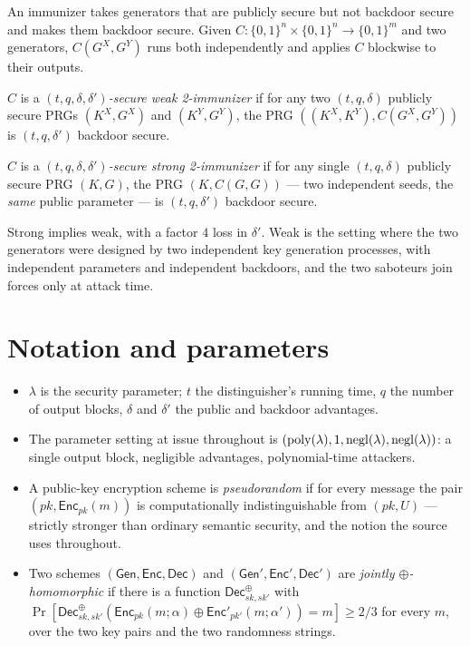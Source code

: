 \documentclass{aicr-conjecture}
\newcommand{\bits}{\{0,1\}}
\newcommand{\negl}{\mathrm{negl}}
\newcommand{\Gen}{\mathsf{Gen}}
\newcommand{\Enc}{\mathsf{Enc}}
\newcommand{\Dec}{\mathsf{Dec}}
\begin{document}
An immunizer takes generators that are publicly secure but not backdoor
secure and makes them backdoor secure. Given $C : \bits^{n} \times
\bits^{n} \to \bits^{m}$ and two generators, $C(G^{X}, G^{Y})$ runs both
independently and applies $C$ blockwise to their outputs.

\begin{definition}\label{def:weak}
$C$ is a \emph{$(t,q,\delta,\delta')$-secure weak 2-immunizer} if for any
two $(t,q,\delta)$ publicly secure PRGs $(K^{X}, G^{X})$ and
$(K^{Y}, G^{Y})$, the PRG $((K^{X},K^{Y}), C(G^{X},G^{Y}))$ is
$(t,q,\delta')$ backdoor secure.
\end{definition}

\begin{definition}\label{def:strong}
$C$ is a \emph{$(t,q,\delta,\delta')$-secure strong 2-immunizer} if for
any single $(t,q,\delta)$ publicly secure PRG $(K,G)$, the PRG
$(K, C(G,G))$ --- two independent seeds, the \emph{same} public parameter
--- is $(t,q,\delta')$ backdoor secure.
\end{definition}

Strong implies weak, with a factor $4$ loss in $\delta'$. Weak is the
setting where the two generators were designed by two independent key
generation processes, with independent parameters and independent
backdoors, and the two saboteurs join forces only at attack time.

\section{Notation and parameters}\label{sec:notation}

\begin{itemize}[nosep]
  \item $\lambda$ is the security parameter; $t$ the distinguisher's
    running time, $q$ the number of output blocks, $\delta$ and
    $\delta'$ the public and backdoor advantages.
  \item The parameter setting at issue throughout is
    $(\poly(\lambda), 1, \negl(\lambda), \negl(\lambda))$: a single
    output block, negligible advantages, polynomial-time attackers.
  \item A public-key encryption scheme is \emph{pseudorandom} if for
    every message the pair $(pk, \Enc_{pk}(m))$ is computationally
    indistinguishable from $(pk, U)$ --- strictly stronger than ordinary
    semantic security, and the notion the source uses throughout.
  \item Two schemes $(\Gen,\Enc,\Dec)$ and $(\Gen',\Enc',\Dec')$ are
    \emph{jointly $\oplus$-homomorphic} if there is a function
    $\Dec^{\oplus}_{sk,sk'}$ with
    $\Pr[\Dec^{\oplus}_{sk,sk'}(\Enc_{pk}(m;\alpha) \oplus
    \Enc'_{pk'}(m;\alpha')) = m] \ge 2/3$ for every $m$, over the two key
    pairs and the two randomness strings.
\end{itemize}
\end{document}
